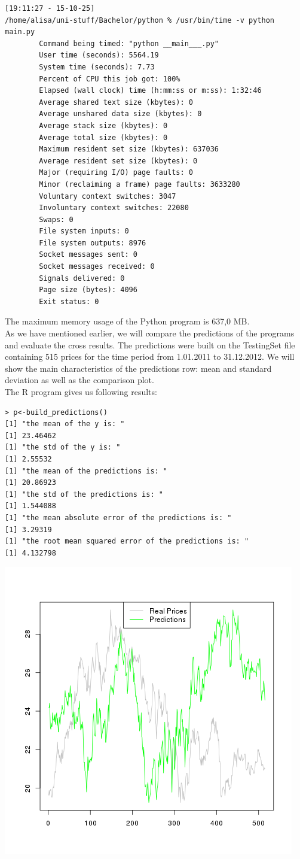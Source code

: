 \documentclass [twoside,
  11pt, a4paper,
  footinclude=true,
  headinclude=true,
  cleardoublepage=empty
]{article}
\begin{document}
\begin{verbatim}
[19:11:27 - 15-10-25] 
/home/alisa/uni-stuff/Bachelor/python % /usr/bin/time -v python main.py
        Command being timed: "python __main___.py"
        User time (seconds): 5564.19
        System time (seconds): 7.73
        Percent of CPU this job got: 100%
        Elapsed (wall clock) time (h:mm:ss or m:ss): 1:32:46
        Average shared text size (kbytes): 0
        Average unshared data size (kbytes): 0
        Average stack size (kbytes): 0
        Average total size (kbytes): 0
        Maximum resident set size (kbytes): 637036
        Average resident set size (kbytes): 0
        Major (requiring I/O) page faults: 0
        Minor (reclaiming a frame) page faults: 3633280
        Voluntary context switches: 3047
        Involuntary context switches: 22080
        Swaps: 0
        File system inputs: 0
        File system outputs: 8976
        Socket messages sent: 0
        Socket messages received: 0
        Signals delivered: 0
        Page size (bytes): 4096
        Exit status: 0
\end{verbatim}
The maximum memory usage of the Python program is 637,0 MB.\\
As we have mentioned earlier, we will compare the predictions of the programs and evaluate the cross results. The predictions were built on the TestingSet file containing 515 prices for the time period from 1.01.2011 to 31.12.2012. We will show the main characteristics of the predictions row: mean and standard deviation as well as the comparison plot.\\
The R program gives us following results:
\begin{verbatim}
> p<-build_predictions()
[1] "the mean of the y is: "
[1] 23.46462
[1] "the std of the y is: "
[1] 2.55532
[1] "the mean of the predictions is: "
[1] 20.86923
[1] "the std of the predictions is: "
[1] 1.544088
[1] "the mean absolute error of the predictions is: "
[1] 3.29319
[1] "the root mean squared error of the predictions is: "
[1] 4.132798
\end{verbatim}
\includegraphics[scale=0.75]{RPredicitions.png}
\end{document}
